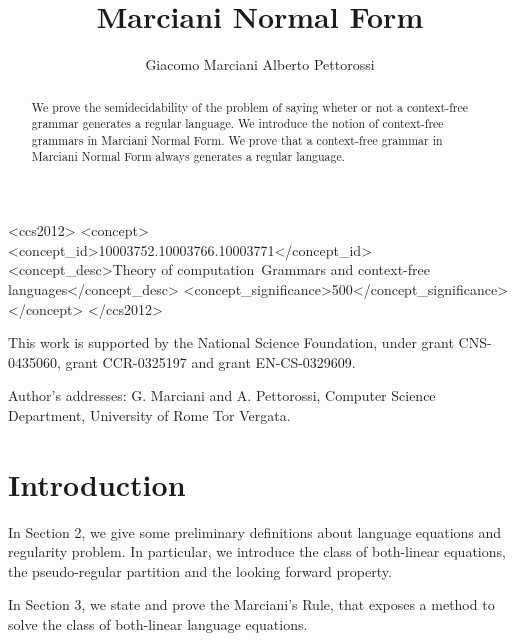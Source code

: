 \documentclass[prodmode,acmtecs]{acmsmall}
\begin{document}

\title{Marciani Normal Form}
\author{Giacomo Marciani
Alberto Pettorossi
}

\begin{abstract}
We prove the semidecidability of the problem of saying wheter or not a context-free
grammar generates a regular language.
We introduce the notion of context-free grammars in Marciani Normal Form.
We prove that a context-free grammar in Marciani Normal Form always generates a
regular language.
\end{abstract}

\begin{CCSXML}
	<ccs2012>
	<concept>
	<concept_id>10003752.10003766.10003771</concept_id>
	<concept_desc>Theory of computation~Grammars and context-free languages</concept_desc>
	<concept_significance>500</concept_significance>
	</concept>
	</ccs2012>
\end{CCSXML}



\begin{bottomstuff}
This work is supported by the National Science Foundation, under
grant CNS-0435060, grant CCR-0325197 and grant EN-CS-0329609.

Author's addresses: G. Marciani {and} A. Pettorossi, Computer Science Department, University of Rome Tor Vergata.
\end{bottomstuff}

\maketitle

\section{Introduction}

In Section 2, we give some preliminary definitions about language
equations and regularity problem. In particular, we introduce the
class of both-linear equations, the pseudo-regular partition and the
looking forward property.

In Section 3, we state and prove the Marciani's Rule, that exposes
a method to solve the class of both-linear language equations.
\end{document}
